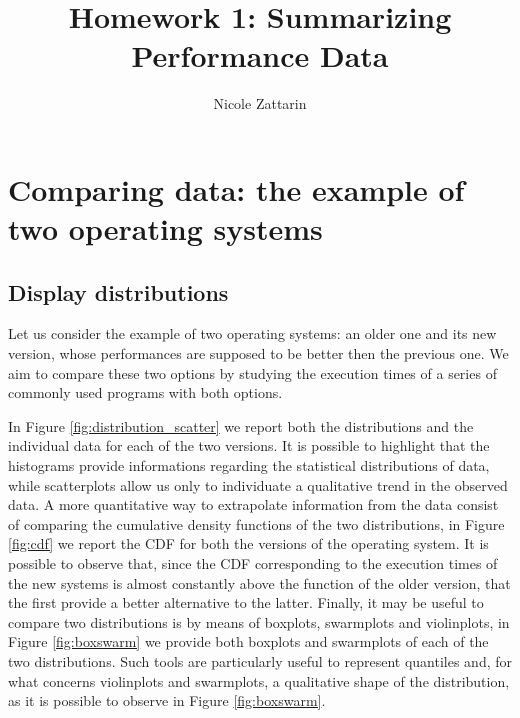 \documentclass[twoside,onecolumn]{article}
\title{Homework 1: Summarizing Performance Data } %
\author{Nicole Zattarin}
\date{}
\theoremstyle{definition}
\begin{document}
\maketitle

\section{Comparing data: the example of two operating systems }
\subsection{Display distributions}
Let us consider the example of two operating systems: an older one and its new version, whose performances are supposed to be better then the previous one. We aim to compare these two options by studying the execution times of a series of commonly used programs with both options. \par
In Figure \ref{fig:distribution_scatter} we report both the distributions and the individual data for each of the two versions. It is possible to highlight that the histograms provide informations regarding the statistical distributions of data, while scatterplots allow us only to individuate a qualitative trend in the observed data.  A more quantitative way to extrapolate information from the data consist of comparing the cumulative density functions of the two distributions, in Figure \ref{fig:cdf} we report the CDF for both the versions of the operating system. It is possible to observe that, since the CDF corresponding to the execution times of the new systems is almost constantly above the function of the older version, that the first provide a better alternative to the latter. Finally, it may be useful to compare two distributions is by means of boxplots, swarmplots and violinplots, in Figure \ref{fig:boxswarm} we provide both boxplots and swarmplots of each of the two distributions. Such tools are particularly useful to represent quantiles and, for what concerns violinplots and swarmplots, a qualitative shape of the distribution, as it is possible to observe in Figure \ref{fig:boxswarm}.
\end{document}
